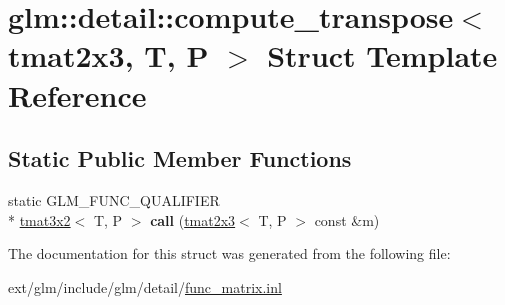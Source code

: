 \hypertarget{structglm_1_1detail_1_1compute__transpose_3_01tmat2x3_00_01_t_00_01_p_01_4}{\section{glm\-:\-:detail\-:\-:compute\-\_\-transpose$<$ tmat2x3, T, P $>$ Struct Template Reference}
\label{structglm_1_1detail_1_1compute__transpose_3_01tmat2x3_00_01_t_00_01_p_01_4}
}
\subsection*{Static Public Member Functions}
\begin{DoxyCompactItemize}
\item 
\hypertarget{structglm_1_1detail_1_1compute__transpose_3_01tmat2x3_00_01_t_00_01_p_01_4_a584c18e615e51a045c2fda8191f4c1b8}{static G\-L\-M\-\_\-\-F\-U\-N\-C\-\_\-\-Q\-U\-A\-L\-I\-F\-I\-E\-R \\*
\hyperlink{structglm_1_1tmat3x2}{tmat3x2}$<$ T, P $>$ {\bfseries call} (\hyperlink{structglm_1_1tmat2x3}{tmat2x3}$<$ T, P $>$ const \&m)}\label{structglm_1_1detail_1_1compute__transpose_3_01tmat2x3_00_01_t_00_01_p_01_4_a584c18e615e51a045c2fda8191f4c1b8}

\end{DoxyCompactItemize}


The documentation for this struct was generated from the following file\-:\begin{DoxyCompactItemize}
\item 
ext/glm/include/glm/detail/\hyperlink{func__matrix_8inl}{func\-\_\-matrix.\-inl}\end{DoxyCompactItemize}
